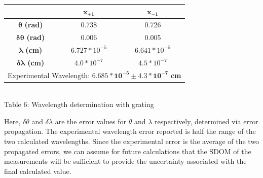 \begin{center}
    
    \centering
    \begin{tabular}{|c|c|c|}
        \hline
         & $\bm{x_{+1}}$ & $\bm{x_{-1}}$ \\ \hline
        $\bm{\theta}$ \textbf{(rad)} & 0.738 & 0.726 \\ 
        $\bm{\delta\theta}$ \textbf{(rad)} & 0.006 & 0.005 \\
        $\bm{\lambda}$ \textbf{(cm)} & $6.727*10^{-5}$ & $6.641*10^{-5}$ \\ 
        $\bm{\delta\lambda}$\textbf{ (cm)} & $4.0*10^{-7}$ & $4.5*10^{-7}$\\\hline
        \multicolumn{3}{|c|}{Experimental Wavelength: $\bm{6.685*10^{-5}\pm4.3*10^{-7}}$ \textbf{cm}}\\ \hline
    \end{tabular} 
    \vspace{3mm}
    \\ Table 6: Wavelength determination with grating\\
\end{center}
Here, $\delta\theta$ and $\delta\lambda$ are the error values for $\theta$ and $\lambda$ respectively, determined via error propagation. 
The experimental wavelength error reported is half the range of the two calculated wavelengths.  
Since the experimental error is the average of the two propagated errors, we can assume for future calculations that the SDOM of the measurements will be sufficient to provide the uncertainty associated with the final calculated value.
